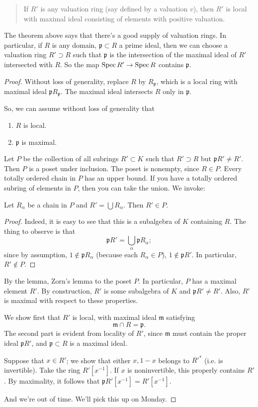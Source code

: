 \begin{quote}
If $R'$ is any valuation ring (say defined by a valuation $v$), then $R'$ is
local with maximal ideal consisting of elements with positive valuation.
\end{quote}

The theorem above says that there's a good supply of valuation rings.
In particular, if $R$ is any domain, $\mathfrak{p} \subset R$ a prime ideal,
then we can choose a valuation ring $R' \supset R$ such that $\mathfrak{p}$ is
the intersection of the maximal ideal of $R'$ intersected with $R$.
So the map $\operatorname{Spec} R' \to \operatorname{Spec} R$ contains $\mathfrak{p}$.

\begin{proof}
Without loss of generality, replace $R$ by $R_{\mathfrak{p}}$, which is a local
ring with maximal ideal $\mathfrak{p}R_{\mathfrak{p}}$. The maximal ideal
intersects $R$ only in $\mathfrak{p}$.

So, we can assume without loss of generality that
\begin{enumerate}
\item $R$ is local.
\item $\mathfrak{p}$ is maximal.
\end{enumerate}

Let $P$ be the collection of all subrings $R' \subset K$ such that $R' \supset
R$ but $\mathfrak{p}R' \neq R'$.  Then $P$ is a poset under inclusion. The
poset is nonempty, since $R \in P$.  Every totally ordered chain in $P$ has an
upper bound.  If you have a totally ordered subring of elements in $P$, then
you can take the union.
We invoke:
\begin{lemma}
Let $R_\alpha$ be a chain in $P$ and $R' = \bigcup R_\alpha$. Then $R' \in P$.
\end{lemma}
\begin{proof}
Indeed, it is easy to see that this is a subalgebra of $K$ containing $R$. The
thing to observe is that
\[ \mathfrak{p}R' = \bigcup_\alpha \mathfrak{p} R_\alpha  ;\]
since by assumption, $1 \notin \mathfrak{p}R_\alpha$ (because each $R_\alpha
\in P$), $1 \notin \mathfrak{p}R'$. In particular, $R' \notin P$.
\end{proof}

By the lemma, Zorn's lemma to the poset $P$. In particular, $P$ has a maximal
element $R'$. By construction, $R'$ is some subalgebra of $K$ and
$\mathfrak{p}R' \neq R'$. Also, $R'$ is maximal with respect to these
properties.

We show first that $R'$ is local, with maximal ideal $\mathfrak{m}$ satisfying
\[ \mathfrak{m} \cap R = \mathfrak{p}.  \]
The second part is evident from locality of $R'$, since $\mathfrak{m} $
must contain
the proper ideal $\mathfrak{p}R'$, and $\mathfrak{p} \subset R$ is a maximal
ideal.

Suppose that $x \in R'$; we show that either $x, 1-x$ belongs to $R'^*$ (i.e.
is invertible). Take the ring $R'[x^{-1}]$.  If $x$ is noninvertible, this
properly contains $R'$.  By maximality, it follows that $\mathfrak{p}R'[x^{-1}]
= R'[x^{-1}]$.

And we're out of time. We'll pick this up on Monday.

\end{proof}

